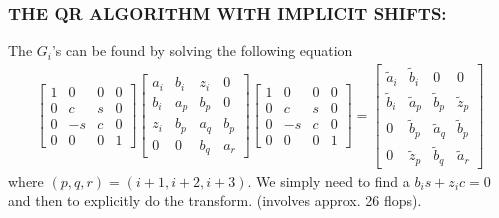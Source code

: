 \documentclass[a4paper,8pt]{beamer} %
\newcommand{\smatrix}[1]{\left[\begin{matrix} #1 \end{matrix}\right]}
\begin{document}
\begin{frame} \frametitle{THE QR ALGORITHM WITH IMPLICIT SHIFTS:} %
		The $G_i$'s can be found by solving the following equation
		\begin{align}
			\smatrix{
				1 & 0 & 0 & 0 \\
				0 & c & s & 0 \\
				0 & -s & c & 0 \\
				0 & 0 & 0 & 1 
			}
			\smatrix{
				a_i& b_i & z_i & 0 \\
				b_i & a_p & b_p & 0 \\
				z_i & b_p & a_q & b_p \\
				0 & 0 & b_q & a_r 
			}
			\smatrix{
				1 & 0 & 0 & 0 \\
				0 & c & s & 0 \\
				0 & -s & c & 0 \\
				0 & 0 & 0 & 1 
			}
			=
			\smatrix{
				\tilde a_i& \tilde b_i & 0 & 0 \\
				\tilde b_i &\tilde a_p &\tilde b_p &\tilde z_p \\
				0 &\tilde b_p &\tilde a_q &\tilde b_p \\
				0 &\tilde z_p &\tilde b_q &\tilde a_r 
			}
		\end{align}
		where $(p,q,r)=(i+1, i+2, i+3)$. We simply need to find a $b_is+z_ic = 0$
		and then to explicitly do the transform. (involves approx. 26 flops).
	\end{frame}%
\end{document}
